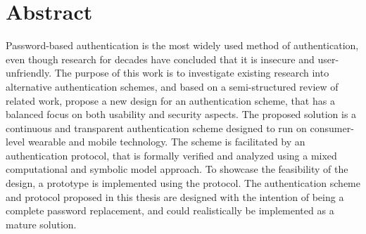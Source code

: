 \begingroup
\let\clearpage\relax
\let\cleardoublepage\relax
\let\cleardoublepage\relax

\chapter*{Abstract}

Password-based authentication is the most widely used method of authentication, even though research for decades have concluded that it is insecure and user-unfriendly. 
The purpose of this work is to investigate existing research into alternative authentication schemes, and based on a semi-structured review of related work, propose a new design for an authentication scheme, that has a balanced focus on both usability and security aspects. The proposed solution is a continuous and transparent authentication scheme designed to run on consumer-level wearable and mobile technology. The scheme is facilitated by an authentication protocol, that is formally verified and analyzed using a mixed computational and symbolic model approach. To showcase the feasibility of the design, a prototype is implemented using the protocol.
The authentication scheme and protocol proposed in this thesis are designed with the intention of being a complete password replacement, and could realistically be implemented as a mature solution.

\vfill


\endgroup			

\vfill